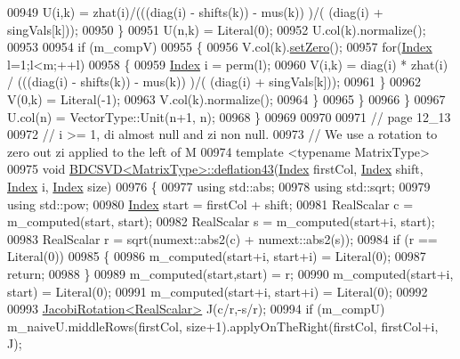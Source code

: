 \begin{DoxyCode}
00949         U(i,k) = zhat(i)/(((diag(i) - shifts(k)) - mus(k)) )/( (diag(i) + singVals[k]));
00950       \}
00951       U(n,k) = Literal(0);
00952       U.col(k).normalize();
00953     
00954       \textcolor{keywordflow}{if} (m\_compV)
00955       \{
00956         V.col(k).\hyperlink{class_eigen_1_1_plain_object_base_ac21ad5f989f320e46958b75ac8d9a1da}{setZero}();
00957         \textcolor{keywordflow}{for}(\hyperlink{namespace_eigen_a62e77e0933482dafde8fe197d9a2cfde}{Index} l=1;l<m;++l)
00958         \{
00959           \hyperlink{namespace_eigen_a62e77e0933482dafde8fe197d9a2cfde}{Index} i = perm(l);
00960           V(i,k) = diag(i) * zhat(i) / (((diag(i) - shifts(k)) - mus(k)) )/( (diag(i) + singVals[k]));
00961         \}
00962         V(0,k) = Literal(-1);
00963         V.col(k).normalize();
00964       \}
00965     \}
00966   \}
00967   U.col(n) = VectorType::Unit(n+1, n);
00968 \}
00969 
00970 
00971 \textcolor{comment}{// page 12\_13}
00972 \textcolor{comment}{// i >= 1, di almost null and zi non null.}
00973 \textcolor{comment}{// We use a rotation to zero out zi applied to the left of M}
00974 \textcolor{keyword}{template} <\textcolor{keyword}{typename} MatrixType>
00975 \textcolor{keywordtype}{void} \hyperlink{group___s_v_d___module_class_eigen_1_1_b_d_c_s_v_d}{BDCSVD<MatrixType>::deflation43}(\hyperlink{namespace_eigen_a62e77e0933482dafde8fe197d9a2cfde}{Index} firstCol, 
      \hyperlink{namespace_eigen_a62e77e0933482dafde8fe197d9a2cfde}{Index} shift, \hyperlink{namespace_eigen_a62e77e0933482dafde8fe197d9a2cfde}{Index} i, \hyperlink{namespace_eigen_a62e77e0933482dafde8fe197d9a2cfde}{Index} size)
00976 \{
00977   \textcolor{keyword}{using} std::abs;
00978   \textcolor{keyword}{using} std::sqrt;
00979   \textcolor{keyword}{using} std::pow;
00980   \hyperlink{namespace_eigen_a62e77e0933482dafde8fe197d9a2cfde}{Index} start = firstCol + shift;
00981   RealScalar c = m\_computed(start, start);
00982   RealScalar s = m\_computed(start+i, start);
00983   RealScalar r = sqrt(numext::abs2(c) + numext::abs2(s));
00984   \textcolor{keywordflow}{if} (r == Literal(0))
00985   \{
00986     m\_computed(start+i, start+i) = Literal(0);
00987     \textcolor{keywordflow}{return};
00988   \}
00989   m\_computed(start,start) = r;  
00990   m\_computed(start+i, start) = Literal(0);
00991   m\_computed(start+i, start+i) = Literal(0);
00992   
00993   \hyperlink{group___jacobi___module_class_eigen_1_1_jacobi_rotation}{JacobiRotation<RealScalar>} J(c/r,-s/r);
00994   \textcolor{keywordflow}{if} (m\_compU)  m\_naiveU.middleRows(firstCol, size+1).applyOnTheRight(firstCol, firstCol+i, J);

\end{DoxyCode}
